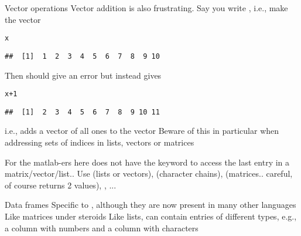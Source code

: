 \documentclass[aspectratio=169]{beamer}\usepackage[]{graphicx}\usepackage[]{xcolor}
\makeatletter
\newcommand{\hlnum}[1]{\textcolor[rgb]{0.686,0.059,0.569}{#1}}%
\newcommand{\hlopt}[1]{\textcolor[rgb]{0,0,0}{#1}}%
\newcommand{\hldef}[1]{\textcolor[rgb]{0.345,0.345,0.345}{#1}}%
\newenvironment{kframe}{%
 \def\at@end@of@kframe{}%
 \ifinner\ifhmode%
  \def\at@end@of@kframe{\end{minipage}}%
  \begin{minipage}{\columnwidth}%
 \fi\fi%
 \def\FrameCommand##1{\hskip\@totalleftmargin \hskip-\fboxsep
 \colorbox{shadecolor}{##1}\hskip-\fboxsep
     \hskip-\linewidth \hskip-\@totalleftmargin \hskip\columnwidth}%
 \MakeFramed {\advance\hsize-\width
   \@totalleftmargin\z@ \linewidth\hsize
   \@setminipage}}%
 {\par\unskip\endMakeFramed%
 \at@end@of@kframe}
\newenvironment{knitrout}{}{} %
\makeatother
\begin{document}
\begin{frame}[fragile]{Vector operations}
Vector addition is also frustrating. Say you write , i.e., make the vector
\begin{knitrout}
\color{fgcolor}\begin{kframe}
\begin{alltt}
\hldef{x}
\end{alltt}
\begin{verbatim}
##  [1]  1  2  3  4  5  6  7  8  9 10
\end{verbatim}
\end{kframe}
\end{knitrout}
Then  should give an error but instead gives
\begin{knitrout}
\color{fgcolor}\begin{kframe}
\begin{alltt}
\hldef{x}\hlopt{+}\hlnum{1}
\end{alltt}
\begin{verbatim}
##  [1]  2  3  4  5  6  7  8  9 10 11
\end{verbatim}
\end{kframe}
\end{knitrout}
i.e., adds a vector of all ones to the vector
\vfill
Beware of this in particular when addressing sets of indices in lists, vectors or matrices
\end{frame} 

\begin{frame}{For the matlab-ers here}
\bbullet {} does not have the keyword  to access the last entry in a matrix/vector/list..
\vfill
\bbullet Use  (lists or vectors),  (character chains),  (matrices.. careful, of course returns 2 values), , ...
\end{frame} 


\begin{frame}{Data frames}
\bbullet Specific to , although they are now present in many other languages
\vfill
\bbullet Like matrices under steroids
\vfill
\bbullet Like lists, can contain entries of different types, e.g., a column with numbers and a column with characters
\end{frame}
\end{document}
